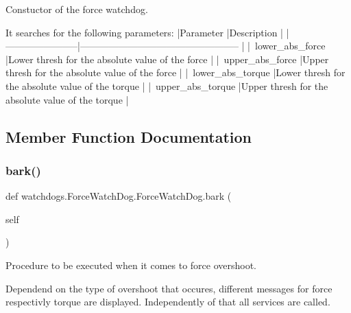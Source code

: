 \begin{DoxyVerb}Constuctor of the force watchdog.

It searches for the following parameters:
|Parameter              |Description                                        |
|-----------------------|-------------------------------------------------- |
|~lower_abs_force       |Lower thresh for the absolute value of the force   |
|~upper_abs_force       |Upper thresh for the absolute value of the force   |
|~lower_abs_torque      |Lower thresh for the absolute value of the torque  |
|~upper_abs_torque      |Upper thresh for the absolute value of the torque  |
\end{DoxyVerb}
 

\subsection{Member Function Documentation}
\mbox{\label{classwatchdogs_1_1ForceWatchDog_1_1ForceWatchDog_ae72127f0144c208bcc8b905178a61afc}} 
\subsubsection{\texorpdfstring{bark()}{bark()}}
{\footnotesize\ttfamily def watchdogs.\+Force\+Watch\+Dog.\+Force\+Watch\+Dog.\+bark (\begin{DoxyParamCaption}\item[{}]{self }\end{DoxyParamCaption})}

\begin{DoxyVerb}Procedure to be executed when it comes to force overshoot.

Dependend on the type of overshoot that occures, different messages for force respectivly torque are displayed.
Independently of that all services are called.\end{DoxyVerb}
 \mbox{\label{classwatchdogs_1_1ForceWatchDog_1_1ForceWatchDog_a4514769fd8ee8398c7842a5dc3ddf463}} 
